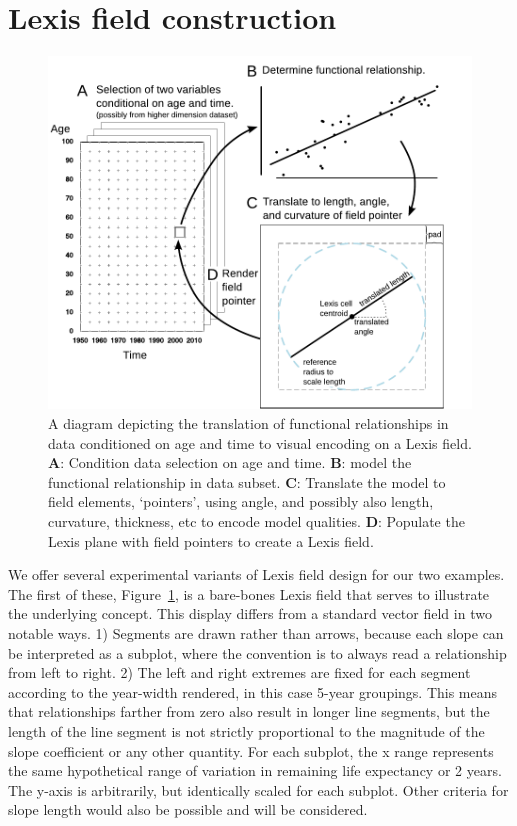 \documentclass{article}
\begin{document}
\section{Lexis field construction}
\begin{figure}[ht!]
  \centering
  \includegraphics[scale=.8]{Figures/ExplainerDiagram.pdf}
  \caption{A diagram depicting the translation of functional relationships in data conditioned on age and time to visual encoding on a Lexis field. \textbf{A}: Condition data selection on age and time. \textbf{B}: model the functional relationship in data subset. \textbf{C}: Translate the model to field elements, `pointers', using angle, and possibly also length, curvature, thickness, etc to encode model qualities. \textbf{D}: Populate the Lexis plane with field pointers to create a Lexis field.}
  \label{fig:sfig1}
\end{figure}

We offer several experimental variants of Lexis field design for our two
examples. The first of these, Figure~\ref{fig:sfig1}, is a bare-bones Lexis field that serves to illustrate the underlying concept. This display differs from a standard vector field in two notable ways. 1) Segments are drawn rather than arrows, because each slope can be
interpreted as a subplot, where the convention is to always read a
relationship from left to right. 2) The left and right extremes are fixed for
each segment according to the year-width rendered, in this case 5-year
groupings. This means that relationships farther from zero also result in longer
line segments, but the length of the line segment is not strictly proportional
to the magnitude of the slope coefficient or any other quantity. For each
subplot, the x range represents the same hypothetical range of
variation in remaining life expectancy or 2 years. The y-axis is arbitrarily,
but identically scaled for each subplot. Other criteria for slope length would
also be possible and will be considered.
\end{document}
